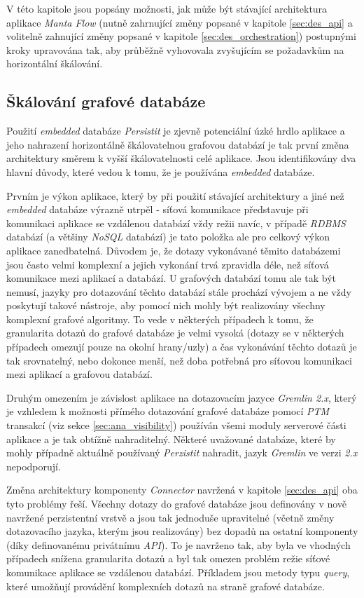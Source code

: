 V této kapitole jsou popsány možnosti, jak může být stávající architektura aplikace \textit{Manta Flow} (nutně zahrnující změny popsané v kapitole \ref{sec:des_api} a volitelně zahnující změny popsané v kapitole \ref{sec:des_orchestration}) postupnými kroky upravována tak, aby průběžně vyhovovala zvyšujícím se požadavkům na horizontální škálování.


\subsection{Škálování grafové databáze}
\label{sec:des_scaling_db}
Použití \textit{embedded} databáze \textit{Persistit} je zjevně potenciální úzké hrdlo aplikace a jeho nahrazení horizontálně škálovatelnou grafovou databází je tak první změna architektury směrem k vyšší škálovatelnosti celé aplikace. Jsou identifikovány dva hlavní důvody, které vedou k tomu, že je používána \textit{embedded} databáze.

Prvním je výkon aplikace, který by při použití stávající architektury a jiné než \textit{embedded} databáze výrazně utrpěl - síťová komunikace představuje při komunikaci aplikace se vzdálenou databází vždy režii navíc, v případě \textit{RDBMS} databází (a většiny \textit{NoSQL} databází) je tato položka ale pro celkový výkon aplikace zanedbatelná. Důvodem je, že dotazy vykonávané těmito databázemi jsou často velmi komplexní a jejich vykonání trvá zpravidla déle, než síťová komunikace mezi aplikací a databází. U grafových databází tomu ale tak být nemusí, jazyky pro dotazování těchto databází stále prochází vývojem a ne vždy poskytují takové nástroje, aby pomocí nich mohly být realizovány všechny komplexní grafové algoritmy. To vede v některých případech k tomu, že granularita dotazů do grafové databáze je velmi vysoká (dotazy se v některých případech omezují pouze na okolní hrany/uzly) a čas vykonávání těchto dotazů je tak srovnatelný, nebo dokonce menší, než doba potřebná pro síťovou komunikaci mezi aplikací a grafovou databází.

Druhým omezením je závislost aplikace na dotazovacím jazyce \textit{Gremlin 2.x}, který je vzhledem k možnosti přímého dotazování grafové databáze pomocí \textit{PTM} transakcí (viz sekce \ref{sec:ana_visibility}) používán všemi moduly serverové části aplikace a je tak obtížně nahraditelný. Některé uvažované databáze, které by mohly případně aktuálně používaný \textit{Perzistit} nahradit, jazyk \textit{Gremlin} ve verzi \textit{2.x} nepodporují.

Změna architektury komponenty \textit{Connector} navržená v kapitole \ref{sec:des_api} oba tyto problémy řeší. Všechny dotazy do grafové databáze jsou definovány v nově navržené perzistentní vrstvě a jsou tak jednoduše upravitelné (včetně změny dotazovacího jazyka, kterým jsou realizovány) bez dopadů na ostatní komponenty (díky definovanému privátnímu \textit{API}). To je navrženo tak, aby byla ve vhodných případech snížena granularita dotazů a byl tak omezen problém režie síťové komunikace aplikace se vzdálenou databází. Příkladem jsou metody typu \textit{query}, které umožňují provádění komplexních dotazů na straně grafové databáze.

